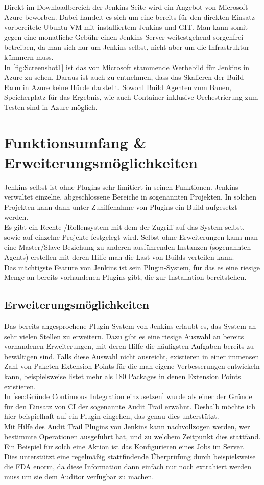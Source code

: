 Direkt im Downloadbereich der Jenkins Seite wird ein Angebot von Microsoft Azure beworben. Dabei handelt es sich um eine bereits für den direkten Einsatz vorbereitete Ubuntu VM mit installiertem Jenkins und GIT. Man kann somit gegen eine monatliche Gebühr einen Jenkins Server weitestgehend sorgenfrei betreiben, da man sich nur um Jenkins selbst, nicht aber um die Infrastruktur kümmern muss. \cite{jenkins-azure}\\
In \autoref{fig:Screenshot1} ist das von Microsoft stammende Werbebild für Jenkins in Azure zu sehen. Daraus ist auch zu entnehmen, dass das Skalieren der Build Farm in Azure keine Hürde darstellt. Sowohl Build Agenten zum Bauen, Speicherplatz für das Ergebnis, wie auch Container inklusive Orchestrierung zum Testen sind in Azure möglich.
\section{Funktionsumfang \& Erweiterungsmöglichkeiten}
Jenkins selbst ist ohne Plugins sehr limitiert in seinen Funktionen. Jenkins verwaltet einzelne, abgeschlossene Bereiche in sogenannten Projekten. In solchen Projekten kann dann unter Zuhilfenahme von Plugins ein Build aufgesetzt werden.\\
Es gibt ein Rechte-/Rollensystem mit dem der Zugriff auf das System selbst, sowie auf einzelne Projekte festgelegt wird. Selbst ohne Erweiterungen kann man eine Master/Slave Beziehung zu anderen ausführenden Instanzen (sogenannten Agents) erstellen mit deren Hilfe man die Last von Builds verteilen kann.\\
Das mächtigste Feature von Jenkins ist sein Plugin-System, für das es eine riesige Menge an bereits vorhandenen Plugins gibt, die zur Installation bereitstehen.
\subsection*{Erweiterungsmöglichkeiten}
Das bereits angesprochene Plugin-System von Jenkins erlaubt es, das System an sehr vielen Stellen zu erweitern. Dazu gibt es eine riesige Auswahl an bereits vorhandenen Erweiterungen, mit deren Hilfe die häufigsten Aufgaben bereits zu bewältigen sind. Falls diese Auswahl nicht ausreicht, existieren in einer immensen Zahl von Paketen Extension Points für die man eigene Verbesserungen entwickeln kann, beispielsweise \cite{jenkins-extensionpoints} listet mehr als 180 Packages in denen Extension Points existieren.\\
In \autoref{sec:Gründe Continuous Integration einzusetzen} wurde als einer der Gründe für den Einsatz von CI der sogenannte Audit Trail erwähnt. Deshalb möchte ich hier beispielhaft auf ein Plugin eingehen, das genau dies unterstützt.\\
Mit Hilfe des Audit Trail Plugins von Jenkins kann nachvollzogen werden, wer bestimmte Operationen ausgeführt hat, und zu welchem Zeitpunkt dies stattfand. Ein Beispiel für solch eine Aktion ist das Konfigurieren eines Jobs im Server. \cite{jenkins-audit-trail}\\
Dies unterstützt eine regelmäßig stattfindende Überprüfung durch beispielsweise die FDA enorm, da diese Information dann einfach nur noch extrahiert werden muss um sie dem Auditor verfügbar zu machen.
